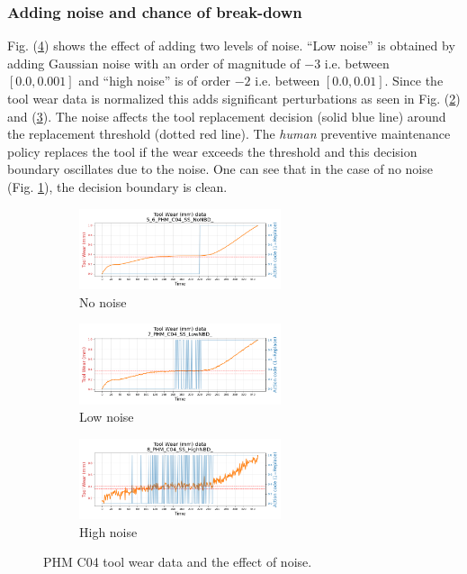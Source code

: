 \documentclass[a4paper, 12pt]{article}
\begin{document}
\subsubsection*{Adding noise and chance of break-down}
Fig. (\ref{fig:noise}) shows the effect of adding two levels of noise. ``Low noise'' is obtained by adding Gaussian noise with an order of magnitude of $-3$ i.e. between $[0.0, 0.001]$ and ``high noise'' is of order $-2$ i.e. between $[0.0, 0.01]$. Since the tool wear data is normalized this adds significant perturbations as seen in Fig. (\ref{fig:LBD}) and (\ref{fig:HBD}). The noise affects the tool replacement decision (solid blue line) around the replacement threshold (dotted red line). The \textit{human} preventive maintenance policy replaces the tool if the wear exceeds the threshold and this decision boundary oscillates due to the noise. One can see that in the case of no noise (Fig. \ref{fig:NBD}), the decision boundary is clean.

\begin{figure}[htbp]
	\begin{subfigure}[b]{\textwidth}
		\centering
		\includegraphics[width=0.65\textwidth]{PHM_C04_NoNBD_wear_plot.png}  
		\caption{No noise}
		\label{fig:NBD}
	\end{subfigure}
	\begin{subfigure}[b]{\textwidth}
		\centering
		\includegraphics[width=0.65\textwidth]{PHM_C04_LowNBD_wear_plot.png}  
		\caption{Low noise}
		\label{fig:LBD}
	\end{subfigure}
	\begin{subfigure}[b]{\textwidth}
		\centering
		\includegraphics[width=0.65\textwidth]{PHM_C04_HighNBD_wear_plot.png}  
		\caption{High noise}
		\label{fig:HBD}
	\end{subfigure}
	\caption{PHM C04 tool wear data and the effect of noise.}
	\label{fig:noise}
\end{figure}
\end{document}
